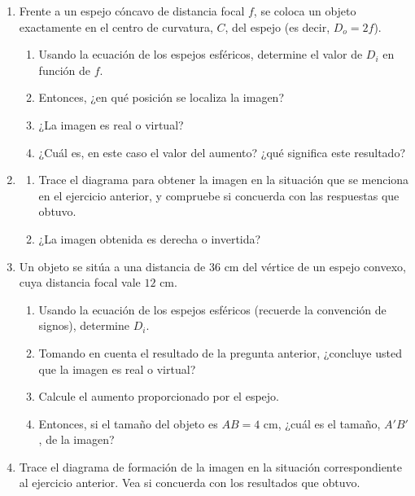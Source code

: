 \documentclass[a4paper, amsfonts, amssymb, amsmath, reprint, showkeys, nofootinbib, twoside]{revtex4-1}
\begin{document}
\begin{enumerate}[start=1, label=\textbf{\arabic*.}]
    \item Frente a un espejo cóncavo de distancia focal $f$, se coloca un objeto exactamente en el centro de curvatura, $C$, del espejo (es decir, $D_o = 2f$).
          \begin{enumerate}[label=\emph{\alph*})]
              \item Usando la ecuación de los espejos esféricos, determine el valor de $D_i$ en función de $f$.
              \item Entonces, ¿en qué posición se localiza la imagen?
              \item ¿La imagen es real o virtual?
              \item ¿Cuál es, en este caso el valor del aumento? ¿qué significa este resultado?
          \end{enumerate}

    \item
          \begin{enumerate}[label=\emph{\alph*})]
              \item Trace el diagrama para obtener la imagen en la situación que se menciona en el ejercicio anterior, y compruebe si concuerda con las respuestas que obtuvo.
              \item ¿La imagen obtenida es derecha o invertida?
          \end{enumerate}

    \item Un objeto se sitúa a una distancia de $36 \text{ cm}$ del vértice de un espejo convexo, cuya distancia focal vale $12 \text{ cm}$.
          \begin{enumerate}[label=\emph{\alph*})]
              \item Usando la ecuación de los espejos esféricos (recuerde la convención de signos), determine $D_i$.
              \item Tomando en cuenta el resultado de la pregunta anterior, ¿concluye usted que la imagen es real o virtual?
              \item Calcule el aumento proporcionado por el espejo.
              \item Entonces, si el tamaño del objeto es $AB = 4 \text{ cm}$, ¿cuál es el tamaño, $A'B'$, de la imagen?
          \end{enumerate}

    \item Trace el diagrama de formación de la imagen en la situación correspondiente al ejercicio anterior. Vea si concuerda con los resultados que obtuvo.


\end{enumerate}
\end{document}
